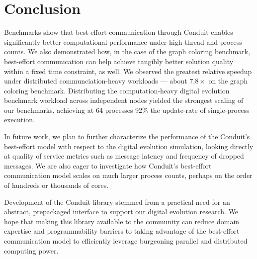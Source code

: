 \section{Conclusion}

Benchmarks show that best-effort communication through Conduit enables significantly better computational performance under high thread and process counts.
We also demonstrated how, in the case of the graph coloring benchmark, best-effort communication can help achieve tangibly better solution quality within a fixed time constraint, as well.  
We observed the greatest relative speedup under distributed communciation-heavy workloads --- about $7.8\times$ on the graph coloring benchmark.
Distributing the computation-heavy digital evolution benchmark workload across independent nodes yielded the strongest scaling of our benchmarks, achieving at 64 processes 92\% the update-rate of single-process execution. 

In future work, we plan to further characterize the performance of the Conduit's best-effort model with respect to the digital evolution simulation, looking directly at quality of service metrics such as message latency and frequency of dropped messages.
We are also eager to investigate how Conduit's best-effort communication model scales on much larger process counts, perhaps on the order of hundreds or thousands of cores.

Development of the Conduit library stemmed from a practical need for an abstract, prepackaged interface to support our digital evolution research.
We hope that making this library available to the community can reduce domain expertise and programmability barriers to taking advantage of the best-effort communication model to efficiently leverage burgeoning parallel and distributed computing power. 